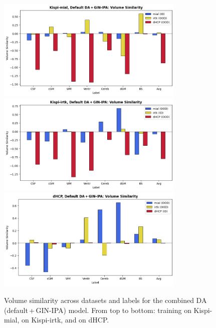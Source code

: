 \begin{figure}[htbp]
    \centering
    \includegraphics[width=0.8\textwidth]{figures/mial_both_VS.png}\\
    \vspace{10pt}
    \includegraphics[width=0.8\textwidth]{figures/irtk_both_VS.png}\\
    \vspace{10pt}
    \includegraphics[width=0.8\textwidth]{figures/dHCP_both_VS.png}
    \caption{Volume similarity across datasets and labels for the combined DA (default\,+\,GIN-IPA) model. From top to bottom: training on Kispi-mial, on Kispi-irtk, and on dHCP.}
    \label{fig:both_VS}
\end{figure}

